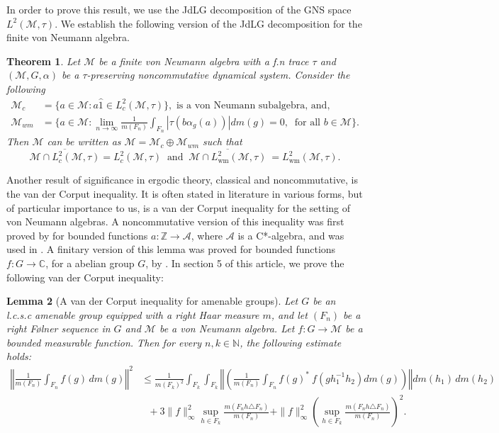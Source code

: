 \documentclass[11pt]{amsart}
\newtheorem{thm}{Theorem}[section]
\newtheorem{lem}[thm]{Lemma}
\theoremstyle{definition}
\theoremstyle{myremark}
\numberwithin{equation}{section}
\def\C{\mathbb C}
\newcommand{\CA}{\mathcal{A}}
\newcommand{\CM}{\mathcal{M}}
\newcommand{\abs}[1]{\left\vert#1\right\vert}
\newcommand{\norm}[1]{\left\Vert#1\right\Vert}
\begin{document}
In order to prove this result, we use the JdLG decomposition of the GNS space $L^{2}(\CM,\tau)$. We  establish the following  version of the JdLG decomposition for the finite von Neumann algebra.
\begin{thm}\label{JdLG}
Let $ \CM$ be a finite von Neumann algebra with a f.n trace $\tau$ and $ (\CM, G, \alpha) $ be a $\tau$-preserving noncommutative dynamical system.  Consider the following 
\begin{align*}
    \CM_{c} &= \{a \in \CM:a \widehat{1}\in L^{2}_{c}(\CM, \tau)\}, \text{ is a von Neumann subalgebra, and,}\\
\CM_{wm}&=\biggl\{a \in \CM:\lim_{n \rightarrow \infty}\frac{1}{m(F_{n})}\int_{F_{n}}\abs{\tau(b\alpha_{g}(a))}dm(g)=0, ~\text{ for all  } b\in \CM \biggr\}.
\end{align*}
Then $\CM$ can be written as 
$\CM=\CM_{c}\oplus \CM_{wm}$ such that 
\[ \overline{ \CM \cap L^{2}_{c}(\CM,\tau)} = L_{c}^{2}(\CM,\tau)    ~\text{ and }~  \overline{ \CM \cap L^{2}_{\text{wm}}(\CM,\tau) } ~=  L^{2}_{\text{wm}}(\CM,\tau) .\]
\end{thm}
Another result of significance in ergodic theory, classical and noncommutative, is the van der Corput inequality. 
It is often stated in literature in various forms, but of particular importance to us, is a van der Corput inequality for the setting of von Neumann algebras. A noncommutative version of this inequality was first proved by \cite{NSZJOT2003} for bounded functions $a:\mathbb{Z} \rightarrow \CA$, where $\CA$ is a C*-algebra, and was used in \cite{Lit2014}. A finitary version of this lemma was proved for bounded functions $f:G \rightarrow \C$, for a abelian group $G$, by \cite{Bahring2019}. In section 5 of this article, we prove the following van der Corput inequality:
\begin{lem}[A van der Corput inequality for amenable groups]\label{Lemma_vand}
Let $G$ be an l.c.s.c amenable group equipped with a right Haar measure $m$, and let $(F_n)$ be a right F\o lner sequence in $G$ and $\CM$ be a  von Neumann algebra. Let $f : G \to \CM$ be a bounded measurable function. Then for every $n, k \in \mathbb{N}$, the following estimate holds:
\begin{align*}\label{Vand_inequality}
\norm{
\frac{1}{m(F_n)} \int_{F_n} f(g)\, dm(g)
}^2 &\leq 
\frac{1}{m(F_k)^2} \int_{F_k} \int_{F_k}
\norm{ \left( \frac{1}{m(F_n)} \int_{F_n}
f( g)^* ~ f( gh_{1}^{-1}h_2) dm(g) \right) }
dm(h_1)\, dm(h_2) \\
&~~~+ 3\|f\|_\infty^2 \sup_{h \in F_k}
\frac{m(F_nh \triangle F_n)}{m(F_n)}  +   \|f\|^2_\infty \left( \sup_{h \in F_k}
\frac{m(F_nh \triangle F_n)}{m(F_n)} \right)^2.
\end{align*}
\end{lem}
\end{document}
